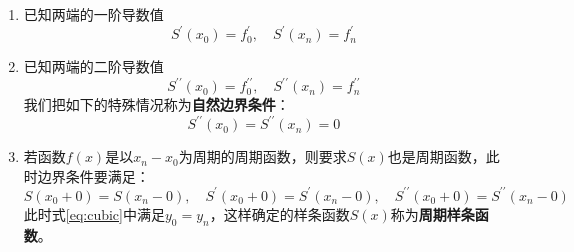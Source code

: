 	\begin{enumerate}
		\item 已知两端的一阶导数值
			\begin{equation}
				S^{\prime}(x_0) = f^\prime_0, \quad S^{\prime}(x_n) = f^\prime_n	\label{eq:first_boundary}
			\end{equation} 
		\item 已知两端的二阶导数值
			\begin{equation}
				S^{\prime\prime}(x_0) = f^{\prime\prime}_0, \quad S^{\prime\prime}(x_n) = f^{\prime\prime}_n	\label{eq:second_boundary}
			\end{equation} 
		我们把如下的特殊情况称为\textbf{自然边界条件}：
		\begin{equation}
			S^{\prime\prime}(x_0) = S^{\prime\prime}(x_n) = 0	\label{eq:natural_boundary}
		\end{equation} 
		\item 若函数$f(x)$是以$x_n - x_0$为周期的周期函数，则要求$S(x)$也是周期函数，此时边界条件要满足：
			\begin{equation}
				S(x_0 + 0 ) = S(x_n - 0), \quad S^{\prime}(x_0 + 0 ) = S^{\prime}(x_n - 0), \quad S^{\prime\prime} (x_0 + 0) = S^{\prime\prime}(x_n - 0)	\label{third_boundary}
			\end{equation} 
			此时式\eqref{eq:cubic}中满足$y_0 = y_n$，这样确定的样条函数$S(x)$称为\textbf{周期样条函数}。
	\end{enumerate}
